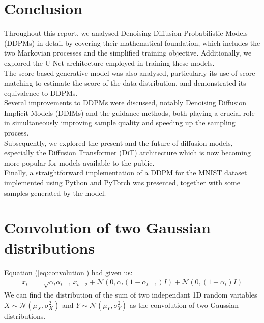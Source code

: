 \documentclass[twoside]{article}
\numberwithin{equation}{section}
\numberwithin{figure}{section}
\begin{document}
\newpage
\section{Conclusion}
Throughout this report, we analysed Denoising Diffusion Probabilistic Models (DDPMs) in detail by covering their mathematical foundation, which includes the two Markovian processes and the simplified training objective. Additionally, we explored the U-Net architecture employed in training these models. \\
The score-based generative model was also analysed, particularly its use of score matching to estimate the score of the data distribution, and demonstrated its equivalence to DDPMs. \\
Several improvements to DDPMs were discussed, notably Denoising Diffusion Implicit Models (DDIMs) and the guidance methods, both playing a crucial role in simultaneously improving sample quality and speeding up the sampling process. \\
Subsequently, we explored the present and the future of diffusion models, especially the Diffusion Transformer (DiT) architecture which is now becoming more popular for models available to the public. \\
Finally, a straightforward implementation of a DDPM for the MNIST dataset implemented using Python and PyTorch was presented, together with some samples generated by the model.

\newpage
\appendix
\section{Convolution of two Gaussian distributions}\label{appendix:a}
Equation (\ref{eq:convolution}) had given us:
\begin{align*}
  x_t &= \sqrt{\alpha_t \alpha_{t-1}} x_{t-2} + \mathcal{N}\left(0, \alpha_t\left(1 - \alpha_{t-1}\right)I \right) + \mathcal{N}\left(0, (1 - \alpha_t) I \right)
\end{align*}
We can find the distribution of the sum of two independant 1D random variables $X \sim \mathcal{N}\left(\mu_X, \sigma_X^2\right)$ and $Y \sim \mathcal{N}\left(\mu_Y, \sigma_Y^2\right)$ as the convolution of two Gaussian distributions.
\end{document}
